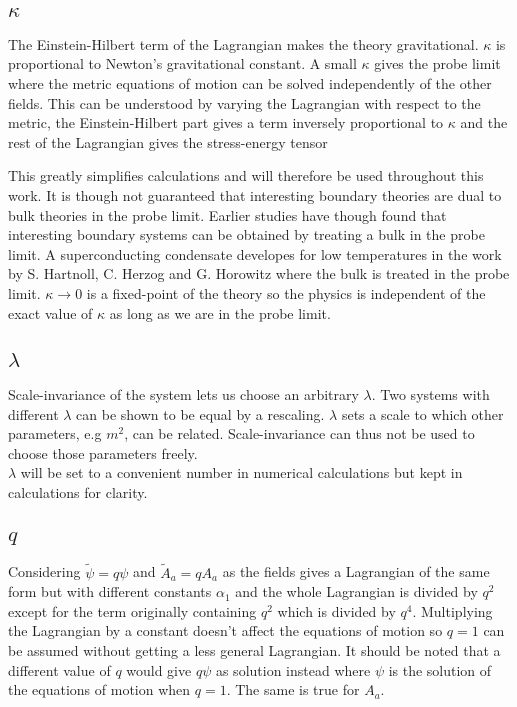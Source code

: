 \documentclass[12pt]{report}
\begin{document}
\subsection{$\kappa$}
The Einstein-Hilbert term of the Lagrangian makes the theory gravitational. $\kappa$ is proportional to Newton's gravitational constant. A small $\kappa$ gives the probe limit where the metric equations of motion can be solved independently of the other fields. This can be understood by varying the Lagrangian with respect to the metric, the Einstein-Hilbert part gives a term inversely proportional to $\kappa$ and the rest of the Lagrangian gives the stress-energy tensor

This greatly simplifies calculations and will therefore be used throughout this work. It is though not guaranteed that interesting boundary theories are dual to bulk theories in the probe limit. Earlier studies have though found that interesting boundary systems can be obtained by treating a bulk in the probe limit. A superconducting condensate developes for low temperatures in the work by S. Hartnoll, C. Herzog and G. Horowitz \cite{hartnoll9} where the bulk is treated in the probe limit. $\kappa\rightarrow0$ is a fixed-point of the theory so the physics is independent of the exact value of $\kappa$ as long as we are in the probe limit.
\subsection{$\lambda$}
Scale-invariance of the system lets us choose an arbitrary $\lambda$. Two systems with different $\lambda$ can be shown to be equal by a rescaling. $\lambda$ sets a scale to which other parameters, e.g $m^2$, can be related. Scale-invariance can thus not be used to choose those parameters freely.\\
$\lambda$ will be set to a convenient number in numerical calculations but kept in calculations for clarity.



\subsection{$q$}
Considering $\tilde{\psi}=q\psi$ and $\tilde{A}_a=qA_a$ as the fields gives a Lagrangian of the same form but with different constants $\alpha_1$ and the whole Lagrangian is divided by $q^2$ except for the term originally containing $q^2$ which is divided by $q^4$. Multiplying the Lagrangian by a constant doesn't affect the equations of motion so $q=1$ can be assumed without getting a less general Lagrangian. It should be noted that a different value of $q$ would give $q\psi$ as solution instead where $\psi$ is the solution of the equations of motion when $q=1$. The same is true for $A_a$.\\
\end{document}
